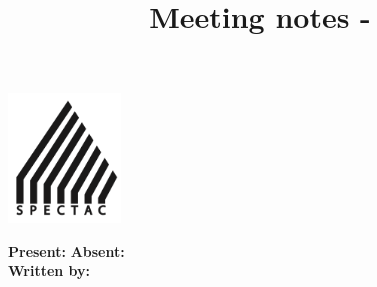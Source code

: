 \documentclass{article}
\begin{document}
    
    
    \vspace*{-3cm}
    \begin{flushright}
        \includegraphics[width=3cm]{img/spectac-logo.png}
    \end{flushright}
    
    \vspace*{-1cm}
    \title{\textbf{\projectname}\\Meeting notes - \writtendate}
    \date{}
    {\let\newpage\relax\maketitle}
    \thispagestyle{empty}
    
    \vspace*{-1cm}
    \textbf{Present:} \present
    \textbf{Absent:} \absent\\[0.3cm]
    \textbf{Written by:} \writtenby
    \renewcommand{\contentsname}{Meeting agenda}
    \tableofcontents
    
    \pagestyle{fancy}
    
\end{document}
